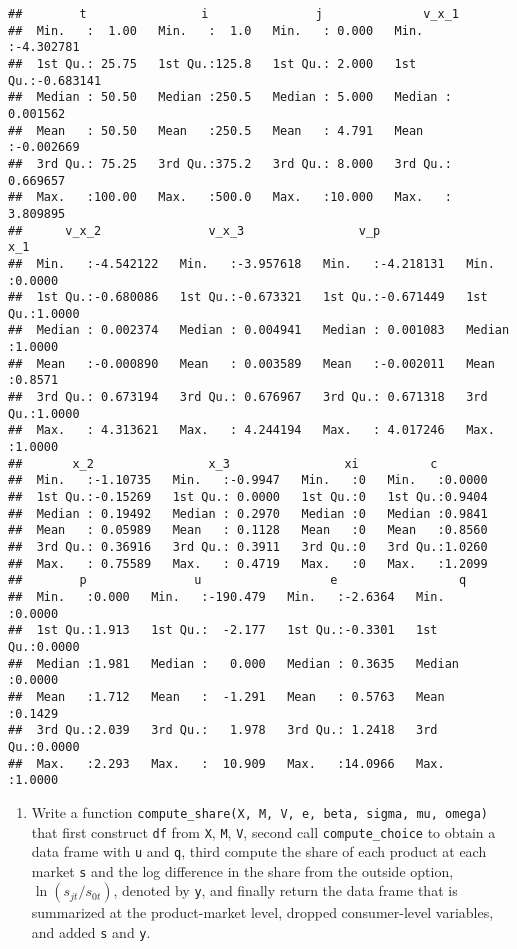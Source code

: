 \documentclass[
]{book}
\providecommand{\tightlist}{%
  \setlength{\itemsep}{0pt}\setlength{\parskip}{0pt}}
\begin{document}
\begin{verbatim}
##        t                i               j              v_x_1          
##  Min.   :  1.00   Min.   :  1.0   Min.   : 0.000   Min.   :-4.302781  
##  1st Qu.: 25.75   1st Qu.:125.8   1st Qu.: 2.000   1st Qu.:-0.683141  
##  Median : 50.50   Median :250.5   Median : 5.000   Median : 0.001562  
##  Mean   : 50.50   Mean   :250.5   Mean   : 4.791   Mean   :-0.002669  
##  3rd Qu.: 75.25   3rd Qu.:375.2   3rd Qu.: 8.000   3rd Qu.: 0.669657  
##  Max.   :100.00   Max.   :500.0   Max.   :10.000   Max.   : 3.809895  
##      v_x_2               v_x_3                v_p                 x_1        
##  Min.   :-4.542122   Min.   :-3.957618   Min.   :-4.218131   Min.   :0.0000  
##  1st Qu.:-0.680086   1st Qu.:-0.673321   1st Qu.:-0.671449   1st Qu.:1.0000  
##  Median : 0.002374   Median : 0.004941   Median : 0.001083   Median :1.0000  
##  Mean   :-0.000890   Mean   : 0.003589   Mean   :-0.002011   Mean   :0.8571  
##  3rd Qu.: 0.673194   3rd Qu.: 0.676967   3rd Qu.: 0.671318   3rd Qu.:1.0000  
##  Max.   : 4.313621   Max.   : 4.244194   Max.   : 4.017246   Max.   :1.0000  
##       x_2                x_3                xi          c         
##  Min.   :-1.10735   Min.   :-0.9947   Min.   :0   Min.   :0.0000  
##  1st Qu.:-0.15269   1st Qu.: 0.0000   1st Qu.:0   1st Qu.:0.9404  
##  Median : 0.19492   Median : 0.2970   Median :0   Median :0.9841  
##  Mean   : 0.05989   Mean   : 0.1128   Mean   :0   Mean   :0.8560  
##  3rd Qu.: 0.36916   3rd Qu.: 0.3911   3rd Qu.:0   3rd Qu.:1.0260  
##  Max.   : 0.75589   Max.   : 0.4719   Max.   :0   Max.   :1.2099  
##        p               u                  e                 q         
##  Min.   :0.000   Min.   :-190.479   Min.   :-2.6364   Min.   :0.0000  
##  1st Qu.:1.913   1st Qu.:  -2.177   1st Qu.:-0.3301   1st Qu.:0.0000  
##  Median :1.981   Median :   0.000   Median : 0.3635   Median :0.0000  
##  Mean   :1.712   Mean   :  -1.291   Mean   : 0.5763   Mean   :0.1429  
##  3rd Qu.:2.039   3rd Qu.:   1.978   3rd Qu.: 1.2418   3rd Qu.:0.0000  
##  Max.   :2.293   Max.   :  10.909   Max.   :14.0966   Max.   :1.0000
\end{verbatim}

\begin{enumerate}
\def\labelenumi{\arabic{enumi}.}
\setcounter{enumi}{8}
\tightlist
\item
  Write a function \texttt{compute\_share(X,\ M,\ V,\ e,\ beta,\ sigma,\ mu,\ omega)} that first construct \texttt{df} from \texttt{X}, \texttt{M}, \texttt{V}, second call \texttt{compute\_choice} to obtain a data frame with \texttt{u} and \texttt{q}, third compute the share of each product at each market \texttt{s} and the log difference in the share from the outside option, \(\ln(s_{jt}/s_{0t})\), denoted by \texttt{y}, and finally return the data frame that is summarized at the product-market level, dropped consumer-level variables, and added \texttt{s} and \texttt{y}.
\end{enumerate}
\end{document}

